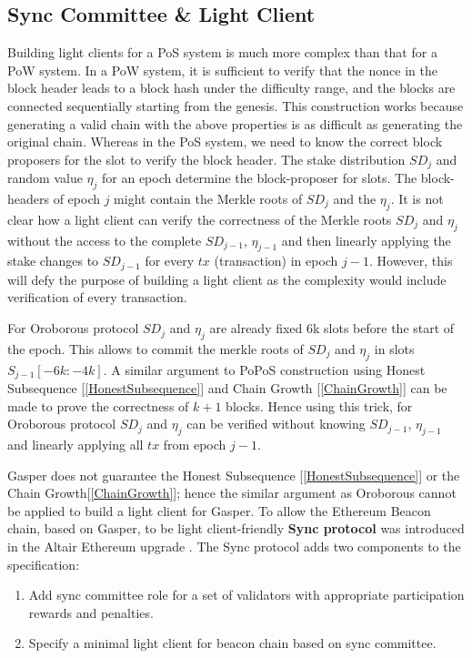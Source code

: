 \subsection{Sync Committee \& Light Client}
Building light clients for a PoS system is much more complex than that for a PoW system. 
In a PoW system, it is sufficient to verify that the nonce in the block header leads to a block hash under the difficulty range, and the blocks are connected sequentially starting from the genesis. 
This construction works because generating a valid chain with the above properties is as difficult as generating the original chain. 
Whereas in the PoS system, we need to know the correct block proposers for the slot to verify the block header. 
The stake distribution $SD_j$ and random value $\eta_j$ for an epoch determine the block-proposer for slots. 
The block-headers of epoch $j$ might contain the Merkle roots of $SD_j$ and the $\eta_j$. 
It is not clear how a light client can verify the correctness of the Merkle roots $SD_j$ and $\eta_j$ without the access to the complete $SD_{j - 1}$, $\eta_{j - 1}$ and then linearly applying the stake changes to $SD_{j - 1}$ for every $tx$ (transaction) in epoch $j - 1$. 
However, this will defy the purpose of building a light client as the complexity would include verification of every transaction. 
  
For Oroborous protocol $SD_j$ and $\eta_j$ are already fixed 6k slots before the start of the epoch. 
This allows to commit the merkle roots of $SD_j$ and $\eta_j$ in slots $S_{j - 1}[-6k: -4k]$. 
A similar argument to PoPoS construction using Honest Subsequence [\ref{HonestSubsequence}] and Chain Growth [\ref{ChainGrowth}] can be made to prove the correctness of $k + 1$ blocks. 
Hence using this trick, for Oroborous protocol $SD_j$ and $\eta_j$ can be verified without knowing $SD_{j - 1}$, $\eta_{j - 1}$ and linearly applying all $tx$ from epoch $j - 1$. 
  
Gasper does not guarantee the Honest Subsequence [\ref{HonestSubsequence}] or the Chain Growth[\ref{ChainGrowth}]; hence the similar argument as Oroborous cannot be applied to build a light client for Gasper. 
To allow the Ethereum Beacon chain, based on Gasper, to be light client-friendly \textbf{Sync protocol} was introduced in the Altair Ethereum upgrade \cite{EthereumConcensusSpecs}. 
The Sync protocol adds two components to the specification:
\begin{enumerate}
    \item Add sync committee role for a set of validators with appropriate participation rewards and penalties.
    \item Specify a minimal light client for beacon chain based on sync committee.
\end{enumerate}
  
